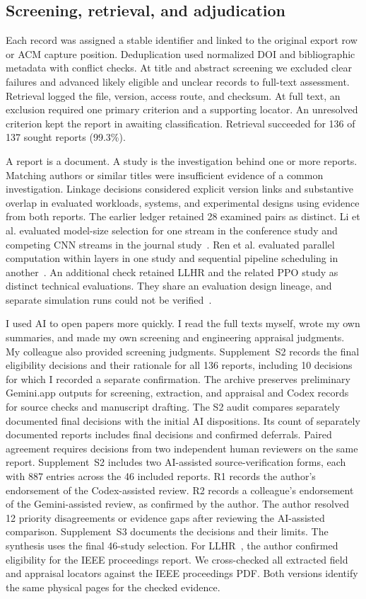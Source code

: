\documentclass[pdflatex,sn-vancouver-num]{sn-jnl}
\begin{document}
\subsection{Screening, retrieval, and adjudication}
Each record was assigned a stable identifier and linked to the original export row or ACM capture position. Deduplication used normalized DOI and bibliographic metadata with conflict checks. At title and abstract screening we excluded clear failures and advanced likely eligible and unclear records to full-text assessment. Retrieval logged the file, version, access route, and checksum. At full text, an exclusion required one primary criterion and a supporting locator. An unresolved criterion kept the report in awaiting classification. Retrieval succeeded for 136 of 137 sought reports (99.3\%).

A report is a document. A study is the investigation behind one or more reports. Matching authors or similar titles were insufficient evidence of a common investigation. Linkage decisions considered explicit version links and substantive overlap in evaluated workloads, systems, and experimental designs using evidence from both reports. The earlier ledger retained 28 examined pairs as distinct. Li et al. evaluated model-size selection for one stream in the conference study and competing CNN streams in the journal study~\cite{R0003,R0059}. Ren et al. evaluated parallel computation within layers in one study and sequential pipeline scheduling in another~\cite{R0015,R0010}. An additional check retained LLHR and the related PPO study as distinct technical evaluations. They share an evaluation design lineage, and separate simulation runs could not be verified~\cite{R0082,R0019}.

I used AI to open papers more quickly. I read the full texts myself, wrote my own summaries, and made my own screening and engineering appraisal judgments. My colleague also provided screening judgments. Supplement~S2 records the final eligibility decisions and their rationale for all 136 reports, including 10 decisions for which I recorded a separate confirmation. The archive preserves preliminary Gemini.app outputs for screening, extraction, and appraisal and Codex records for source checks and manuscript drafting. The S2 audit compares separately documented final decisions with the initial AI dispositions. Its count of separately documented reports includes final decisions and confirmed deferrals. Paired agreement requires decisions from two independent human reviewers on the same report. Supplement~S2 includes two AI-assisted source-verification forms, each with 887 entries across the 46 included reports. R1 records the author's endorsement of the Codex-assisted review. R2 records a colleague's endorsement of the Gemini-assisted review, as confirmed by the author. The author resolved 12 priority disagreements or evidence gaps after reviewing the AI-assisted comparison. Supplement~S3 documents the decisions and their limits. The synthesis uses the final 46-study selection. For LLHR~\cite{R0082}, the author confirmed eligibility for the IEEE proceedings report. We cross-checked all extracted field and appraisal locators against the IEEE proceedings PDF. Both versions identify the same physical pages for the checked evidence.
\end{document}
